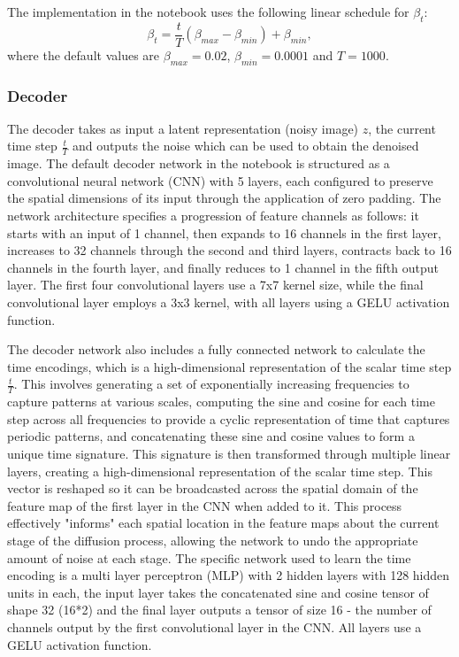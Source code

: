 \documentclass[11pt]{article}
\begin{document}
The implementation in the notebook uses the following linear schedule for $\beta_t$:
\begin{equation}
    \beta_t = \frac{t}{T}(\beta_{max}-\beta_{min})+ \beta_{min},
\end{equation}
where the default values are $\beta_{max} = 0.02$, $\beta_{min} = 0.0001$ and $T=1000$.

\subsubsection{Decoder}
The decoder takes as input a latent representation (noisy image) $z$, the current time step $\frac{t}{T}$ and outputs the noise which can be used to obtain the denoised image. The default decoder network in the notebook is structured as a convolutional neural network (CNN) with 5 layers, each configured to preserve the spatial dimensions of its input through the application of zero padding. The network architecture specifies a progression of feature channels as follows: it starts with an input of 1 channel, then expands to 16 channels in the first layer, increases to 32 channels through the second and third layers, contracts back to 16 channels in the fourth layer, and finally reduces to 1 channel in the fifth output layer. The first four convolutional layers use a 7x7 kernel size, while the final convolutional layer employs a 3x3 kernel, with all layers using a GELU activation function. 

The decoder network also includes a fully connected network to calculate the time encodings, which is a high-dimensional representation of the scalar time step $\frac{t}{T}$. This involves generating a set of exponentially increasing frequencies to capture patterns at various scales, computing the sine and cosine for each time step across all frequencies to provide a cyclic representation of time that captures periodic patterns, and concatenating these sine and cosine values to form a unique time signature. This signature is then transformed through multiple linear layers, creating a high-dimensional representation of the scalar time step. This vector is reshaped so it can be broadcasted across the spatial domain of the feature map of the first layer in the CNN when added to it. This process effectively "informs" each spatial location in the feature maps about the current stage of the diffusion process, allowing the network to undo the appropriate amount of noise at each stage. The specific network used to learn the time encoding is a multi layer perceptron (MLP) with 2 hidden layers with 128 hidden units in each, the input layer takes the concatenated sine and cosine tensor of shape 32 (16*2) and the final layer outputs a tensor of size 16 - the number of channels output by the first convolutional layer in the CNN. All layers use a GELU activation function.
\end{document}
